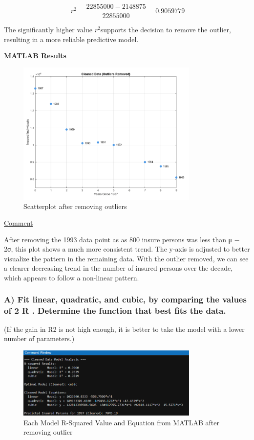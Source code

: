 \documentclass[12pt]{article}
\begin{document}
\[
\ r^2 = \frac{22855000 - 2148875}{22855000} = 0.9059779
\]

The significantly higher value \(r^2\)supports the decision to remove the outlier, resulting in
a more reliable predictive model.


\textbf{MATLAB Results}

\begin{figure}[H]
    \centering
    \includegraphics[width=0.8\textwidth]{4.png}
    \caption{Scatterplot after removing outliers}
\end{figure} 

\uline{Comment}

After removing the 1993 data point as as 800 insure persons was less than μ − 2σ, this plot
shows a much more consistent trend. The y-axis is adjusted to better visualize the pattern in
the remaining data. With the outlier removed, we can see a clearer decreasing trend in the
number of insured persons over the decade, which appears to follow a non-linear pattern.

\subsubsection*{A) Fit linear, quadratic, and cubic, by comparing the values of 2 R . Determine the
function that best fits the data.}

(If the gain in R2 is not high enough, it is better to take the model with a lower number of parameters.)

\begin{figure}[H]
    \centering
    \includegraphics[width=0.8\textwidth]{5.png}
    \caption{Each Model R-Squared Value and Equation from MATLAB after removing outlier}
\end{figure} 
\end{document}
